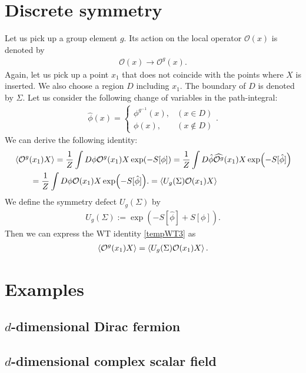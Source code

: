 \documentclass[12pt]{scrartcl}
\newcommand{\Ocal}{\mathcal{O}}
\newcommand{\phih}{\hat{\phi}}
\begin{document}
\section{Discrete symmetry}
Let us pick up a group element $g$. Its action on the local operator $\Ocal(x)$ is denoted by
\begin{align}
    \Ocal(x)\to \Ocal^g(x).
\end{align}
Again, let us pick up a point $x_1$ that does not coincide with the points where $X$ is inserted.  We also choose a region $D$ including $x_1$.  The boundary of $D$ is denoted by $\Sigma$.  Let us consider the following change of variables in the path-integral:
\begin{align}
    \phih(x)=
    \begin{cases}
        \phi^{g^{-1}}(x),& (x\in D)\\
        \phi(x),& (x\notin D)
    \end{cases}.
\end{align}
We can derive the following identity:
\begin{align}
    &\expval{\Ocal^{g}(x_1) X}
    =\frac{1}{Z}\int D\phi \Ocal^{g}(x_1) X \exp(-S[\phi])
    =\frac{1}{Z}\int D\phih \widehat{\Ocal^{g}}(x_1) X \exp(-S[\phih])\nonumber\\    
    &\qquad =\frac{1}{Z}\int D\phi \Ocal(x_1) X \exp(-S[\phih]).
    \label{tempWT3}
    =\expval{U_{g}(\Sigma)\Ocal(x_1)X}
\end{align}
We define the symmetry defect $U_{g}(\Sigma)$ by
\begin{align}
    U_{g}(\Sigma):=\exp(-S[\phih]+S[\phi]).
\end{align}
Then we can express the WT identity \eqref{tempWT3} as
\begin{align}
    \expval{\Ocal^{g}(x_1)X}
    =\expval{U_{g}(\Sigma)\Ocal(x_1)X}.
\end{align}

\section{Examples}
\subsection{$d$-dimensional Dirac fermion}
\subsection{$d$-dimensional complex scalar field}
\end{document}
